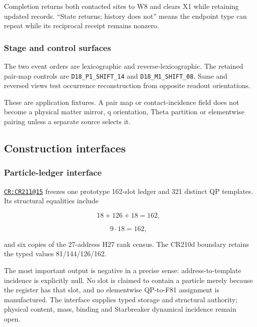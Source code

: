 Completion returns both contacted sites to W8 and clears X1 while
retaining updated records. ``State returns; history does not'' means the
endpoint type can repeat while its reciprocal receipt remains nonzero.

\subsubsection{Stage and control
surfaces}\label{viii-ch08-stage-and-control-surfaces}

The two event orders are lexicographic and reverse-lexicographic. The
retained pair-map controls are \texttt{D18\_\nolinkurl{P1_SHIFT_1}4} and
\texttt{D18\_\nolinkurl{M1_SHIFT_0}8}. Same and reversed views test occurrence
reconstruction from opposite readout orientations.

These are application fixtures. A pair map or contact-incidence field
does not become a physical matter mirror, q orientation, Theta partition
or elementwise pairing unless a separate source selects it.

\subsection{Construction interfaces}\label{viii-ch08-construction-interfaces}

\subsubsection{Particle-ledger
interface}\label{viii-ch08-particle-ledger-interface}

\href{https://github.com/iwtbotiwtwot/SAMA/blob/4c2b5dc1649da5900c90b90d0ce56c223dbb7717/tests/courtroom/15-scale-bridge-simulator-cr211-starbreaker-particle-ledger-interface/README.md}{\texttt{CR:CR211@15}}
freezes one prototype 162-slot ledger and 321 distinct QP templates. Its
structural equalities include

\[
18+126+18=162,
\]

\[
9\cdot18=162,
\]

and six copies of the 27-address H27 rank census. The CR210d boundary
retains the typed values 81/144/126/162.

The most important output is negative in a precise sense:
address-to-template incidence is explicitly null. No slot is claimed to
contain a particle merely because the register has that slot, and no
elementwise QP-to-F81 assignment is manufactured. The interface supplies
typed storage and structural authority; physical content, mass, binding
and Starbreaker dynamical incidence remain open.

